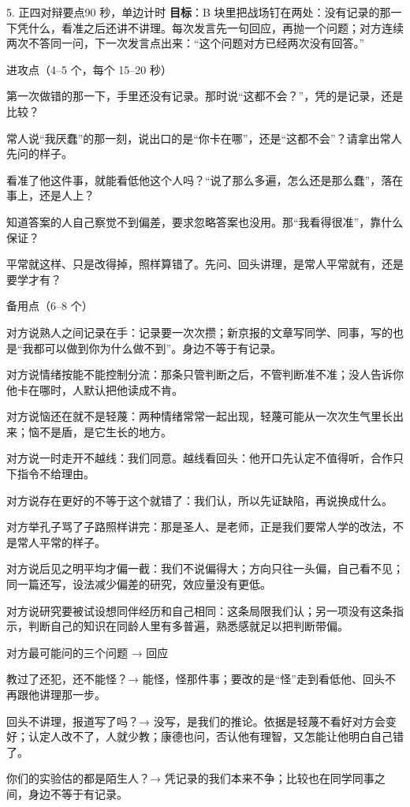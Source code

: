 \documentclass[script,pro]{debate}
\begin{document}
\begin{stage}{5. 正四对辩要点}{90 秒，单边计时}
\textbf{目标}：B 块里把战场钉在两处：没有记录的那一下凭什么，看准之后还讲不讲理。每次发言先一句回应，再抛一个问题；对方连续两次不答同一问，下一次发言点出来：“这个问题对方已经两次没有回答。”
\begin{points}{进攻点（4–5 个，每个 15–20 秒）}
\item 第一次做错的那一下，手里还没有记录。那时说“这都不会？”，凭的是记录，还是比较？
\item 常人说“我厌蠢”的那一刻，说出口的是“你卡在哪”，还是“这都不会”？请拿出常人先问的样子。
\item 看准了他这件事，就能看低他这个人吗？“说了那么多遍，怎么还是那么蠢”，落在事上，还是人上？
\item 知道答案的人自己察觉不到偏差，要求忽略答案也没用。那“我看得很准”，靠什么保证？
\item 平常就这样、只是改得掉，照样算错了。先问、回头讲理，是常人平常就有，还是要学才有？
\end{points}
\begin{points}{备用点（6–8 个）}
\item 对方说熟人之间记录在手：记录要一次次攒；新京报的文章写同学、同事，写的也是“我都可以做到你为什么做不到”。身边不等于有记录。
\item 对方说情绪按能不能控制分流：那条只管判断之后，不管判断准不准；没人告诉你他卡在哪时，人默认把他读成不肯。
\item 对方说恼还在就不是轻蔑：两种情绪常常一起出现，轻蔑可能从一次次生气里长出来；恼不是盾，是它生长的地方。
\item 对方说一时走开不越线：我们同意。越线看回头：他开口先认定不值得听，合作只下指令不给理由。
\item 对方说存在更好的不等于这个就错了：我们认，所以先证缺陷，再说换成什么。
\item 对方举孔子骂了子路照样讲完：那是圣人、是老师，正是我们要常人学的改法，不是常人平常的样子。
\item 对方说后见之明平均才偏一截：我们不说偏得大；方向只往一头偏，自己看不见；同一篇还写，设法减少偏差的研究，效应量没有更低。
\item 对方说研究要被试设想同伴经历和自己相同：这条局限我们认；另一项没有这条指示，判断自己的知识在同龄人里有多普遍，熟悉感就足以把判断带偏。
\end{points}
\begin{points}{对方最可能问的三个问题 → 回应}
\item 教过了还犯，还不能怪？→ 能怪，怪那件事；要改的是“怪”走到看低他、回头不再跟他讲理那一步。
\item 回头不讲理，报道写了吗？→ 没写，是我们的推论。依据是轻蔑不看好对方会变好；认定人改不了，人就少教；康德也问，否认他有理智，又怎能让他明白自己错了。
\item 你们的实验估的都是陌生人？→ 凭记录的我们本来不争；比较也在同学同事之间，身边不等于有记录。
\end{points}
\end{stage}
\end{document}
